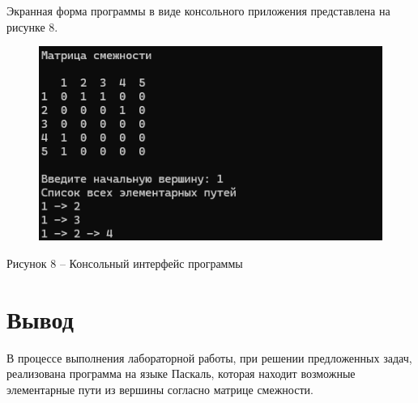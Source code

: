 \documentclass[a4paper,14pt]{extarticle}
\begin{document}
  \pagebreak
  Экранная форма программы в виде консольного приложения представлена на рисунке 8.

  \begin{figure}[h]
    \centering
    \includegraphics[width=0.8\linewidth]{images/image.png}
  \end{figure}
  \begin{center}
    Рисунок 8 – Консольный интерфейс программы
  \end{center}

  \section*{\hspace{12.5mm}Вывод}
  В процессе выполнения лабораторной работы, при решении предложенных задач, реализована программа на языке Паскаль, которая находит возможные элементарные пути из вершины согласно матрице смежности.
\end{document}
